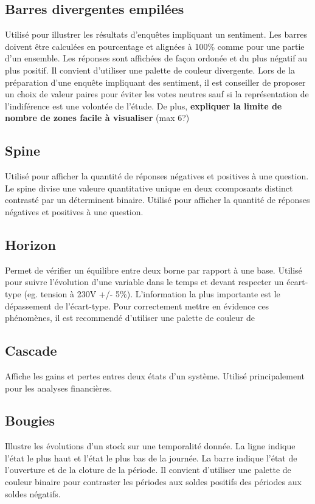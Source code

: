 \documentclass[a4paper,12pt]{article}
\begin{document}
\begin{multicols}{2}
\subsection*{Barres divergentes empilées}
\label{sec:orgdf09412}
Utilisé pour illustrer les résultats d'enquêtes impliquant un sentiment. \autocite{alansmithLexiqueVisuel} Les barres doivent être calculées en pourcentage et alignées à 100\% comme pour une partie d'un ensemble. Les réponses sont affichées de façon ordonée et du plus négatif au plus positif. Il convient d'utiliser une palette de couleur divergente. Lors de la préparation d'une enquête impliquant des sentiment, il est conseiller de proposer un choix de valeur paires pour éviter les votes neutres sauf si la représentation de l'indiférence est une volontée de l'étude. De plus, \textbf{expliquer la limite de nombre de zones facile à visualiser} (max 6?)
\subsection*{Spine}
\label{sec:orgee05448}
Utilisé pour afficher la quantité de réponses négatives et positives à une question. Le spine divise une valeure quantitative unique en deux ccomposants distinct contrasté par un déterminent binaire. \autocite{alansmithLexiqueVisuel} Utilisé pour afficher la quantité de réponses négatives et positives à une question.
\subsection*{Horizon}
\label{sec:org86c4b1f}
Permet de vérifier un équilibre entre deux borne par rapport à une base. \autocite{alansmithLexiqueVisuel}  Utilisé pour suivre l'évolution d'une variable dans le temps et devant respecter un écart-type (eg. tension à 230V +/- 5\%). L'information la plus importante est le dépassement de l'écart-type. Pour correctement mettre en évidence ces phénomènes, il est recommendé d'utiliser une palette de couleur de
\subsection*{Cascade}
\label{sec:org1baec96}
Affiche les gains et pertes entres deux états d'un système. \autocite{jonathanschwabishComparingCategories2021} Utilisé principalement pour les analyses financières. \autocite{alansmithLexiqueVisuel}
\subsection*{Bougies}
\label{sec:org57a1c76}
Illustre les évolutions d'un stock sur une temporalité donnée. La ligne indique l'état le plus haut et l'état le plus bas de la journée. La barre indique l'état de l'ouverture et de la cloture de la période. \autocite{jonathanschwabishDistribution2021} Il convient d'utiliser une palette de couleur binaire pour contraster les périodes aux soldes positifs des périodes aux soldes négatifs.

\end{multicols}
\end{document}
